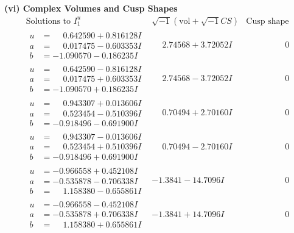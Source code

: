 \documentclass[1p]{elsarticle_modified}
\theoremstyle{definition}
\newcommand{\I}{\sqrt{-1}}
\begin{document}
\newpage\flushleft \textbf{(vi) Complex Volumes and Cusp Shapes}
$$\begin{array}{c|c|c}  
\text{Solutions to }I^u_{1}& \I (\text{vol} + \sqrt{-1}CS) & \text{Cusp shape}\\
 \hline 
\begin{aligned}
u &= \phantom{-}0.642590 + 0.816128 I \\
a &= \phantom{-}0.017475 - 0.603353 I \\
b &= -1.090570 - 0.186235 I\end{aligned}
 & \phantom{-}2.74568 + 3.72052 I & \phantom{-0.000000 } 0 \\ \hline\begin{aligned}
u &= \phantom{-}0.642590 - 0.816128 I \\
a &= \phantom{-}0.017475 + 0.603353 I \\
b &= -1.090570 + 0.186235 I\end{aligned}
 & \phantom{-}2.74568 - 3.72052 I & \phantom{-0.000000 } 0 \\ \hline\begin{aligned}
u &= \phantom{-}0.943307 + 0.013606 I \\
a &= \phantom{-}0.523454 - 0.510396 I \\
b &= -0.918496 - 0.691900 I\end{aligned}
 & \phantom{-}0.70494 + 2.70160 I & \phantom{-0.000000 } 0 \\ \hline\begin{aligned}
u &= \phantom{-}0.943307 - 0.013606 I \\
a &= \phantom{-}0.523454 + 0.510396 I \\
b &= -0.918496 + 0.691900 I\end{aligned}
 & \phantom{-}0.70494 - 2.70160 I & \phantom{-0.000000 } 0 \\ \hline\begin{aligned}
u &= -0.966558 + 0.452108 I \\
a &= -0.535878 - 0.706338 I \\
b &= \phantom{-}1.158380 - 0.655861 I\end{aligned}
 & -1.3841 - 14.7096 I & \phantom{-0.000000 } 0 \\ \hline\begin{aligned}
u &= -0.966558 - 0.452108 I \\
a &= -0.535878 + 0.706338 I \\
b &= \phantom{-}1.158380 + 0.655861 I\end{aligned}
 & -1.3841 + 14.7096 I & \phantom{-0.000000 } 0 \\ \hline\begin{aligned}

\end{aligned}
\end{array}$$
\end{document}
